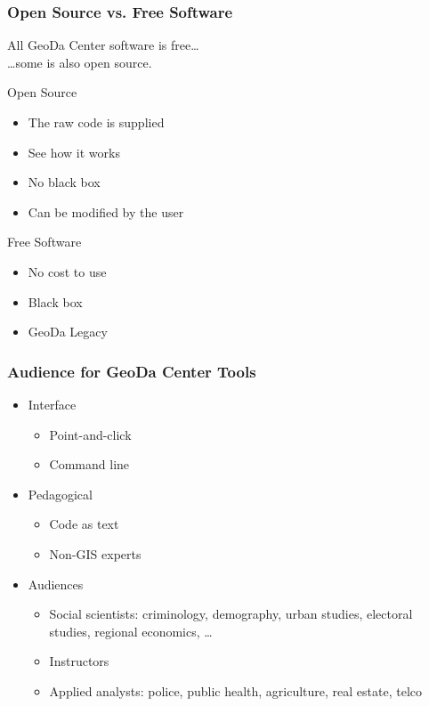 \documentclass[nototal]{beamer}
\begin{document}
\begin{frame}
	\frametitle{Open Source vs. Free Software}
  All GeoDa Center software is free\dots \\ \qquad\qquad\qquad\qquad\qquad\dots some is also open source.
 
\begin{block}{Open Source}
 \begin{itemize}
 \item The raw code is supplied
 \item See how it works
 \item No black box
 \item Can be modified by the user
 \end{itemize}
 \end{block} 
\begin{block}{Free Software}
 \begin{itemize}
 \item No cost to use
 \item Black box
 \item GeoDa Legacy
 \end{itemize}
 \end{block} \end{frame} 

\begin{frame}
	\frametitle{Audience for GeoDa Center Tools}
 \begin{itemize}
 \item Interface
 \begin{itemize}
 \item Point-and-click
 \item Command line
 \end{itemize}
 \item Pedagogical
 \begin{itemize}
 \item Code as text
 \item Non-GIS experts
 \end{itemize}
 \item Audiences
 \begin{itemize}
 \item Social scientists: criminology, demography, urban studies, electoral studies, regional economics, \ldots
 \item Instructors
 \item Applied analysts: police, public health, agriculture, real estate, telco
 \end{itemize}
 \end{itemize}
 \end{frame} 
\end{document}
